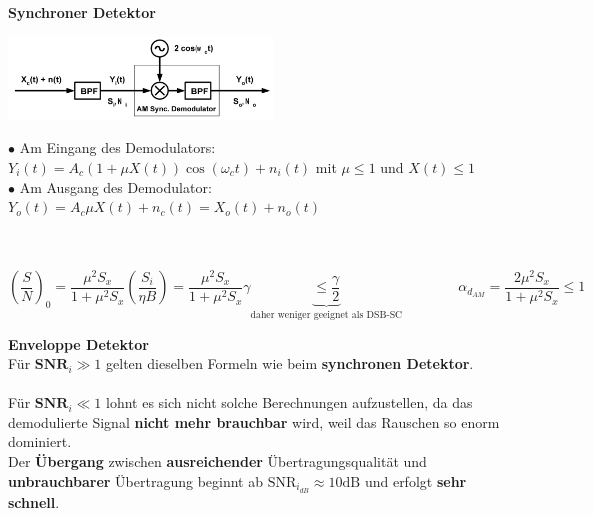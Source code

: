 \textbf{Synchroner Detektor}\\
\begin{minipage}{7.5cm}
	\includegraphics[width = 7cm]{./bilder/08_Sync_Detektor_AM}
\end{minipage}
\begin{minipage}{11cm}
  $\bullet$ Am Eingang des Demodulators:\\ 
  \hspace*{0.3cm}$Y_i(t) = A_c(1 + \mu X(t)) \cos (\omega_c t) + n_i(t)$ \qquad mit $\mu \leq 1$ und $X(t) \leq 1$\\
  $\bullet$ Am Ausgang des Demodulator:\\ 
  \hspace*{0.3cm} $Y_o(t) = A_c\mu X(t) + n_c(t) = X_o(t) + n_o(t)$
\end{minipage}\\ \\

$$ \left(\dfrac{S}{N}\right)_0 =
\dfrac{\mu^2 S_x}{1 + \mu^2 S_x} \left(\dfrac{S_i}{\eta B}\right) = \dfrac{\mu^2 S_x}{1 + \mu^2
S_x} \gamma \underbrace{\leq \dfrac{\gamma}{2}}_{\text{daher weniger geeignet als DSB-SC}} \qquad \qquad
\alpha_{d_{AM}} = \dfrac{2 \mu^2 S_x}{1 + \mu^2 S_x} \leq 1$$


\textbf{Enveloppe Detektor} \\
Für \boldmath$ \textbf{SNR}_i \gg 1 $ gelten dieselben Formeln wie beim \textbf{synchronen
Detektor}. \\ \\ Für \boldmath$ \textbf{SNR}_i \ll 1 $ lohnt es sich nicht solche
Berechnungen aufzustellen, da das demodulierte Signal \textbf{nicht mehr brauchbar} wird, weil das Rauschen so enorm dominiert. \\
Der \textbf{Übergang} zwischen \textbf{ausreichender} Übertragungsqualität und \textbf{unbrauchbarer}  
Übertragung beginnt ab \unboldmath$ \text{SNR}_{i_{dB}} \approx 10 \text{dB} $ und erfolgt
\textbf{sehr schnell}.

